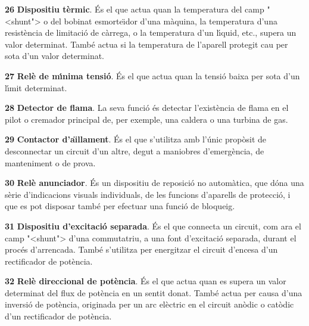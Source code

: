 \begin{multicols}{2}
\begin{list}{}
\item[\textbf{26}]  \textbf{Dispositiu t\`{e}rmic}. \'{E}s el que
actua quan la temperatura del camp {"<}shunt{">} o del bobinat esmorte\"{\i}dor
d'una m\`{a}quina, la temperatura d'una resist\`{e}ncia de limitaci\'{o} de
c\`{a}rrega, o la temperatura d'un l\'{\i}quid, etc., supera un valor
determinat. Tamb\'{e} actua si la temperatura de l'aparell protegit cau
per sota d'un valor determinat.

\item[\textbf{27}]  \textbf{Rel\`{e} de m\'{\i}nima tensi\'{o}}. \'{E}s el que
actua quan la tensi\'{o} baixa per sota d'un l\'{\i}mit determinat.

\item[\textbf{28}]  \textbf{Detector de flama}. La seva funci\'{o} \'{e}s
detectar l'exist\`{e}ncia de flama en el pilot o cremador principal de, per exemple, una
caldera o una turbina de gas.

\item[\textbf{29}]  \textbf{Contactor d'a\"{\i}llament}. \'{E}s el que
s'utilitza amb l'\'{u}nic prop\`{o}sit de desconnectar un circuit d'un
altre, degut a maniobres    d'emerg\`{e}ncia,  de manteniment o de
prova.

\item[\textbf{30}]  \textbf{Rel\`{e} anunciador}. \'{E}s un dispositiu de
reposici\'{o} no autom\`{a}tica, que d\'{o}na una s\`{e}rie d'indicacions visuals
individuals, de les funcions d'aparells de protecci\'{o}, i que es pot
disposar tamb\'{e} per efectuar una funci\'{o} de bloqueig.

\item[\textbf{31}]  \textbf{Dispositiu d'excitaci\'{o}
separada}. \'{E}s el que connecta un circuit, com ara el camp {"<}shunt{">}
d'una commutatriu, a una font d'excitaci\'{o} separada, durant el proc\'{e}s
d'arrencada. Tamb\'{e} s'utilitza per energitzar el circuit d'encesa
d'un rectificador de pot\`{e}ncia.


\item[\textbf{32}]  \textbf{Rel\`{e} direccional de
pot\`{e}ncia}. \'{E}s el que actua quan es supera un valor determinat del
flux de pot\`{e}ncia en un sentit donat. Tamb\'{e} actua per causa d'una
inversi\'{o} de pot\`{e}ncia, originada per un arc el\`{e}ctric en el circuit
an\`{o}dic o  cat\`{o}dic d'un rectificador de pot\`{e}ncia.


\end{list}
\end{multicols}
